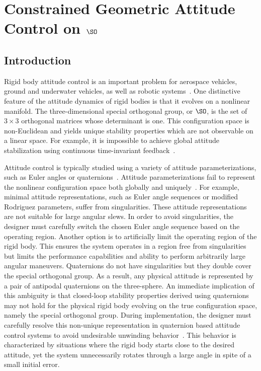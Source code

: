 
\chapter{Constrained Geometric Attitude Control on \( \SO \) }


\section{Introduction}\label{sec:intro}
Rigid body attitude control is an important problem for aerospace vehicles, ground and underwater vehicles, as well as robotic systems~\cite{hughes2004,wertz1978}.
One distinctive feature of the attitude dynamics of rigid bodies is that it evolves on a nonlinear manifold.
The three-dimensional special orthogonal group, or \( \SO \), is the set of \( 3 \times 3 \) orthogonal matrices whose determinant is one.
This configuration space is non-Euclidean and yields unique stability properties which are not observable on a linear space.
For example, it is impossible to achieve global attitude stabilization using continuous time-invariant feedback~\cite{bhat2000}.



Attitude control is typically studied using a variety of attitude parameterizations, such as Euler angles or quaternions~\cite{shuster1993}.
Attitude parameterizations fail to represent the nonlinear configuration space both globally and uniquely~\cite{chaturvedi2011a}.
For example, minimal attitude representations, such as Euler angle sequences or modified Rodriguez parameters, suffer from singularities.
These attitude representations are not suitable for large angular slews.
In order to avoid singularities, the designer must carefully switch the chosen Euler angle sequence based on the operating region.
Another option is to artificially limit the operating region of the rigid body.
This ensures the system operates in a region free from singularities but limits the performance capabilities and ability to perform arbitrarily large angular maneuvers.
Quaternions do not have singularities but they double cover the special orthogonal group.
As a result, any physical attitude is represented by a pair of antipodal quaternions on the three-sphere.
An immediate implication of this ambiguity is that closed-loop stability properties derived using quaternions may not hold for the physical rigid body evolving on the true configuration space, namely the special orthogonal group.
During implementation, the designer must carefully resolve this non-unique representation in quaternion based attitude control systems to avoid undesirable unwinding behavior~\cite{bhat2000}.
This behavior is characterized by situations where the rigid body starts close to the desired attitude, yet the system unnecessarily rotates through a large angle in spite of a small initial error. 

